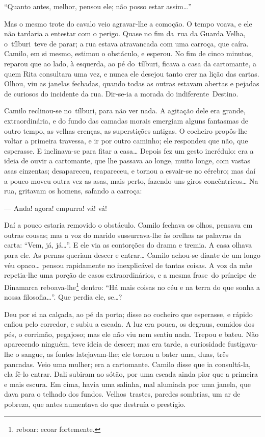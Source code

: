 ``Quanto antes, melhor, pensou ele; não posso estar assim\ldots''

Mas o mesmo trote do cavalo veio agravar-lhe a comoção. O tempo voava, e
ele não tardaria a entestar com o perigo. Quase no fim da~rua da Guarda
Velha, o~tílburi~teve de parar; a rua estava atravancada com uma
carroça, que caíra. Camilo, em si mesmo, estimou o obstáculo, e esperou.
No fim de cinco minutos, reparou que ao lado, à esquerda, ao pé
do~tílburi, ficava a casa da cartomante, a quem Rita consultara uma vez,
e nunca ele desejou tanto crer na lição das cartas. Olhou, viu as
janelas fechadas, quando todas as outras estavam abertas e pejadas de
curiosos do incidente da rua. Dir-se-ia a morada do indiferente~Destino.

Camilo reclinou-se no~tílburi, para não ver nada. A agitação dele era
grande, extraordinária, e do fundo das camadas morais emergiam alguns
fantasmas de outro tempo, as velhas crenças, as superstições antigas. O
cocheiro propôs-lhe voltar a primeira travessa, e ir por outro caminho;
ele respondeu que não, que esperasse. E inclinava-se para fitar a
casa\ldots{} Depois fez um gesto incrédulo: era a ideia de ouvir a
cartomante, que lhe passava ao longe, muito longe, com vastas asas
cinzentas; desapareceu, reapareceu, e tornou a esvair-se no cérebro; mas
daí a pouco moveu outra vez as asas, mais perto, fazendo uns giros
concêntricos\ldots{} Na rua, gritavam os homens, safando a carroça:

--- Anda! agora! empurra! vá! vá!

Daí a pouco estaria removido o obstáculo. Camilo fechava os olhos,
pensava em outras cousas; mas a voz do marido sussurrava-lhe às orelhas
as palavras da carta: ``Vem, já, já\ldots''. E ele via as contorções do
drama e tremia. A casa olhava para ele. As pernas queriam descer e
entrar\ldots{} Camilo achou-se diante de um longo véu opaco\ldots{}
pensou rapidamente no inexplicável de tantas coisas. A voz da mãe
repetia-lhe uma porção de casos extraordinários, e a mesma frase~do
príncipe de Dinamarca reboava-lhe\footnote{reboar: ecoar fortemente.}
dentro: ``Há mais coisas no céu e na terra do que sonha a nossa
filosofia\ldots''. Que perdia ele, se\ldots?

Deu por si na calçada, ao pé da porta; disse ao cocheiro que esperasse,
e rápido enfiou pelo corredor, e subiu a escada. A luz era pouca, os
degraus, comidos dos pés, o corrimão, pegajoso; mas ele não viu nem
sentiu nada. Trepou e bateu. Não aparecendo ninguém, teve ideia de
descer; mas era tarde, a curiosidade fustigava-lhe o sangue, as fontes
latejavam-lhe; ele tornou a bater uma, duas, três pancadas. Veio uma
mulher; era a cartomante. Camilo disse que ia consultá-la, ela fê-lo
entrar. Dali subiram ao sótão, por uma escada ainda pior que a primeira
e mais escura. Em cima, havia uma salinha, mal alumiada por uma janela,
que dava para o telhado dos fundos. Velhos~trastes, paredes sombrias, um
ar de pobreza, que antes aumentava do que destruía o prestígio.

